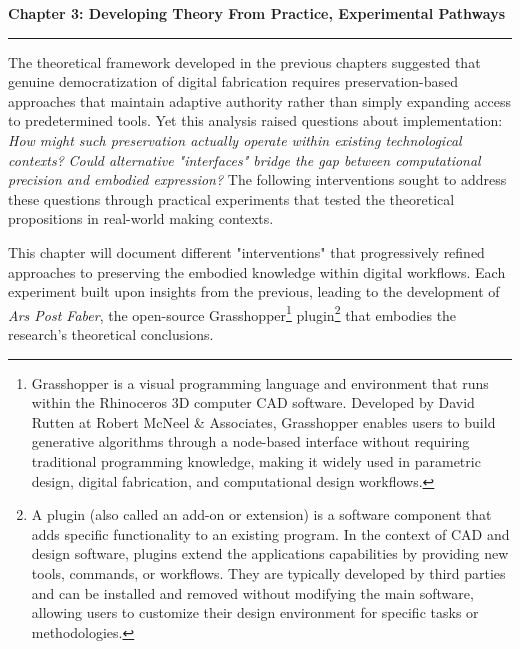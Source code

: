 \clearpage

\setcounter{chapter}{3}
\setcounter{section}{0}


\pagestyle{fancy}
\fancyhf{} %
\fancyfoot[C]{\thepage} %
\renewcommand{\headrulewidth}{0pt}
\renewcommand{\footrulewidth}{0pt}


\noindent
{\Large\textbf{Chapter 3: Developing Theory From Practice, Experimental Pathways}}
\vspace{0.3cm}
\hrule
\vspace{0.8cm}
\label{ch:experimental_pathways}

\setlength{\parindent}{0pt}
The theoretical framework developed in the previous chapters suggested that genuine democratization of digital fabrication requires preservation-based approaches that maintain adaptive authority rather than simply expanding access to predetermined tools. Yet this analysis raised questions about implementation: \textit{How might such preservation actually operate within existing technological contexts?} \textit{Could alternative "interfaces" bridge the gap between computational precision and embodied expression?} The following interventions sought to address these questions through practical experiments that tested the theoretical propositions in real-world making contexts.

\vspace{0.5cm}

This chapter will document different "interventions" that progressively refined approaches to preserving the embodied knowledge within digital workflows. Each experiment built upon insights from the previous, leading to the development of \textit{Ars Post Faber}, the open-source Grasshopper\footnote{Grasshopper is a visual programming language and environment that runs within the Rhinoceros 3D computer CAD software. Developed by David Rutten at Robert McNeel \& Associates, Grasshopper enables users to build generative algorithms through a node-based interface without requiring traditional programming knowledge, making it widely used in parametric design, digital fabrication, and computational design workflows.} plugin\footnote{A plugin (also called an add-on or extension) is a software component that adds specific functionality to an existing program. In the context of CAD and design software, plugins extend the applications capabilities by providing new tools, commands, or workflows. They are typically developed by third parties and can be installed and removed without modifying the main software, allowing users to customize their design environment for specific tasks or methodologies.} that embodies the research's theoretical conclusions.

